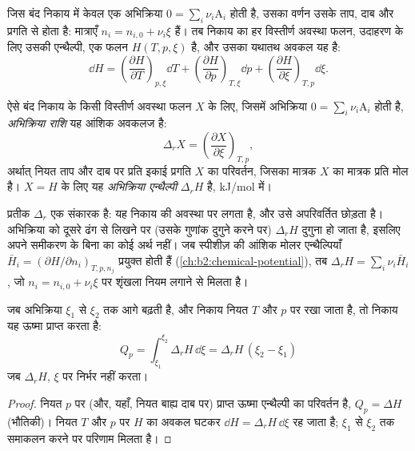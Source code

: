 जिस बंद निकाय में केवल एक अभिक्रिया $0 = \sum_i\nu_i\mathrm A_i$
होती है, उसका वर्णन उसके ताप, दाब और प्रगति से होता है:
मात्राएँ $n_i = n_{i,0} + \nu_i\xi$ हैं। तब निकाय का हर विस्तीर्ण अवस्था फलन,
उदाहरण के लिए उसकी एन्थैल्पी, एक फलन $H(T, p,
\xi)$ है, और उसका यथातथ अवकल यह है:
\[
  \dd H = \left(\frac{\partial H}{\partial T}\right)_{p,\xi}\dd T
        + \left(\frac{\partial H}{\partial p}\right)_{T,\xi}\dd p
        + \left(\frac{\partial H}{\partial \xi}\right)_{T,p}\dd\xi .
\]

\begin{definition}[अभिक्रिया राशि, अभिक्रिया एन्थैल्पी]\label{def:b2:reaction-enthalpy:reaction-quantity}
ऐसे बंद निकाय के किसी विस्तीर्ण अवस्था फलन $X$ के लिए, जिसमें
अभिक्रिया $0 = \sum_i\nu_i\mathrm A_i$ होती है, \emph{अभिक्रिया
राशि} यह आंशिक अवकलज है:
\[
  \Delta_r X = \left(\frac{\partial X}{\partial \xi}\right)_{T,p} ,
\]
अर्थात् नियत ताप और दाब पर प्रति इकाई प्रगति $X$ का परिवर्तन, जिसका मात्रक
$X$ का मात्रक प्रति मोल है। $X = H$ के लिए यह \emph{अभिक्रिया
एन्थैल्पी} $\Delta_r H$ है, \unit{kJ/mol} में।
\end{definition}

\begin{remark}[अवकलज, अंतर नहीं]\label{rem:b2:reaction-enthalpy:operator}
प्रतीक $\Delta_r$ एक संकारक है: यह निकाय की अवस्था पर लगता है, और उसे
अपरिवर्तित छोड़ता है। अभिक्रिया को दूसरे ढंग से लिखने पर (उसके गुणांक दुगुने
करने पर) $\Delta_r H$ दुगुना हो जाता है, इसलिए अपने समीकरण के बिना  का कोई अर्थ नहीं। जब स्पीशीज़ की आंशिक मोलर एन्थैल्पियाँ
$\bar H_i = (\partial H/\partial n_i)_{T,p,n_j}$ प्रयुक्त होती हैं
(\cref{ch:b2:chemical-potential}), तब $\Delta_r H = \sum_i\nu_i\bar H_i$, जो
$n_i = n_{i,0} + \nu_i\xi$ पर शृंखला नियम लगाने से मिलता है।
\end{remark}

\begin{proposition}[नियत ताप और दाब पर प्राप्त ऊष्मा]\label{prop:b2:reaction-enthalpy:qp}
जब अभिक्रिया $\xi_1$ से $\xi_2$ तक आगे बढ़ती है, और निकाय नियत $T$
और $p$ पर रखा जाता है, तो निकाय यह ऊष्मा प्राप्त करता है:
\[
  Q_p = \int_{\xi_1}^{\xi_2}\Delta_r H\,\dd\xi = \Delta_r H\,(\xi_2 - \xi_1)
\]
जब $\Delta_r H$, $\xi$ पर निर्भर नहीं करता।
\end{proposition}

\begin{proof}
नियत $p$ पर (और, यहाँ, नियत बाह्य दाब पर) प्राप्त ऊष्मा एन्थैल्पी
का परिवर्तन है, $Q_p = \Delta H$ (भौतिकी)। नियत $T$ और $p$ पर
$H$ का अवकल घटकर $\dd H = \Delta_r H\,\dd\xi$ रह जाता है; $\xi_1$ से
$\xi_2$ तक समाकलन करने पर परिणाम मिलता है।
\end{proof}

